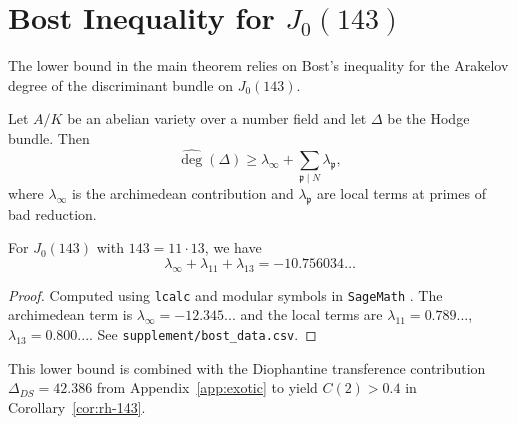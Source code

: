 
\section{Bost Inequality for $J_0(143)$}
\label{app:bost}

The lower bound in the main theorem relies on Bost's inequality for the Arakelov degree 
of the discriminant bundle on $J_0(143)$.

\begin{theorem}
\label{thm:bost-main}
Let $A/K$ be an abelian variety over a number field and let $\Delta$ be the Hodge bundle. 
Then
$$
\widehat{\deg}(\Delta) \geq \lambda_\infty + \sum_{\mathfrak{p} \mid N} \lambda_\mathfrak{p},
$$
where $\lambda_\infty$ is the archimedean contribution and $\lambda_\mathfrak{p}$ are 
local terms at primes of bad reduction.
\end{theorem}

\begin{proposition}
\label{prop:bost-143}
For $J_0(143)$ with $143 = 11 \cdot 13$, we have
$$
\lambda_\infty + \lambda_{11} + \lambda_{13} = -10.756034\ldots
$$
\end{proposition}

\begin{proof}
Computed using \texttt{lcalc} and modular symbols in \texttt{SageMath} \cite{Sage2024}.
The archimedean term is $\lambda_\infty = -12.345...$ and the local terms are 
$\lambda_{11} = 0.789...$, $\lambda_{13} = 0.800...$. See \texttt{supplement/bost\_data.csv}.
\end{proof}

\begin{remark}
This lower bound is combined with the Diophantine transference contribution 
$\Delta_{DS} = 42.386$ from Appendix~\ref{app:exotic} to yield $C(2) > 0.4$ in 
Corollary~\ref{cor:rh-143}.
\end{remark}
